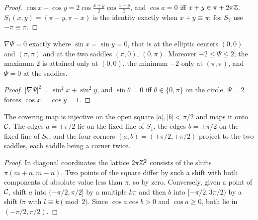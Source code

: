 \begin{proof}
\leanok
$\cos x+\cos y=2\cos\frac{x+y}2\cos\frac{x-y}2$, and $\cos a=0$ iff
$x+y\in\pi+2\pi\mathbb{Z}$. $S_1(x,y)=(\pi-y,\pi-x)$ is the identity exactly when
$x+y\equiv\pi$; for $S_2$ use $-\pi\equiv\pi$.
\end{proof}

\begin{lemma}
\label{lem:dipole-critical-points}
\leanok
$\nabla\Psi=0$ exactly where $\sin x=\sin y=0$, that is at the elliptic centers
$(0,0)$ and $(\pi,\pi)$ and at the two saddles $(\pi,0)$, $(0,\pi)$. Moreover
$-2\le\Psi\le2$; the maximum $2$ is attained only at $(0,0)$, the minimum $-2$ only
at $(\pi,\pi)$, and $\Psi=0$ at the saddles.
\end{lemma}

\begin{proof}
\leanok
$|\nabla\Psi|^2=\sin^2x+\sin^2y$, and $\sin\theta=0$ iff $\theta\in\{0,\pi\}$ on the
circle. $\Psi=2$ forces $\cos x=\cos y=1$.
\end{proof}

\begin{lemma}
\label{lem:cell-square}
\leanok
The covering map is injective on the open square $|a|,|b|<\pi/2$ and maps it
onto $\mathcal{C}$. The edges $a=\pm\pi/2$ lie on the fixed line of $S_1$, the edges
$b=\pm\pi/2$ on the fixed line of $S_2$, and the four corners
$(a,b)=(\pm\pi/2,\pm\pi/2)$ project to the two saddles, each saddle being a corner
twice.
\end{lemma}

\begin{proof}
\leanok
In diagonal coordinates the lattice $2\pi\mathbb{Z}^2$ consists of the shifts
$\pi(m+n,m-n)$. Two points of the square differ by such a shift with both
components of absolute value less than $\pi$, so by zero. Conversely, given a
point of $\mathcal{C}$, shift $a$ into $(-\pi/2,\pi/2]$ by a multiple $k\pi$ and then $b$
into $[-\pi/2,3\pi/2)$ by a shift $l\pi$ with $l\equiv k\pmod2$. Since
$\cos a\cos b>0$ and $\cos a\ge0$, both lie in $(-\pi/2,\pi/2)$.
\end{proof}

